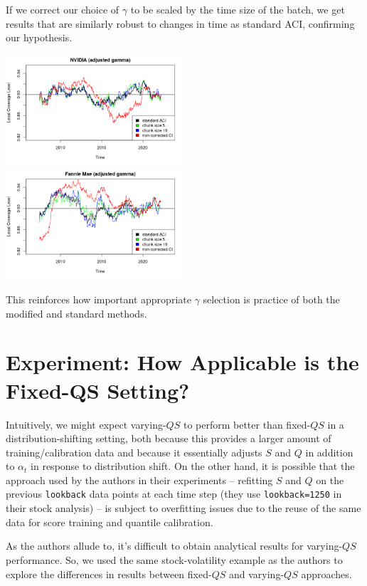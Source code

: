 \documentclass[
]{article}
\begin{document}
If we correct our choice of \(\gamma\) to be scaled by the time size of
the batch, we get results that are similarly robust to changes in time
as standard ACI, confirming our hypothesis.

\includegraphics[width=0.5\textwidth,height=\textheight]{./images/9nvidiamodifiedadj.png}
\includegraphics[width=0.5\textwidth,height=\textheight]{./images/10fmmodifiedadj.png}

This reinforces how important appropriate \(\gamma\) selection is
practice of both the modified and standard methods.

\hypertarget{experiment-how-applicable-is-the-fixed-qs-setting}{%
\section{Experiment: How Applicable is the Fixed-QS
Setting?}\label{experiment-how-applicable-is-the-fixed-qs-setting}}

Intuitively, we might expect varying-\(QS\) to perform better than
fixed-\(QS\) in a distribution-shifting setting, both because this
provides a larger amount of training/calibration data and because it
essentially adjusts \(S\) and \(Q\) in addition to \(\alpha_t\) in
response to distribution shift. On the other hand, it is possible that
the approach used by the authors in their experiments -- refitting \(S\)
and \(Q\) on the previous \texttt{lookback} data points at each time
step (they use \texttt{lookback=1250} in their stock analysis) -- is
subject to overfitting issues due to the reuse of the same data for
score training and quantile calibration.

As the authors allude to, it's difficult to obtain analytical results
for varying-\(QS\) performance. So, we used the same stock-volatility
example as the authors to explore the differences in results between
fixed-\(QS\) and varying-\(QS\) approaches.
\end{document}
